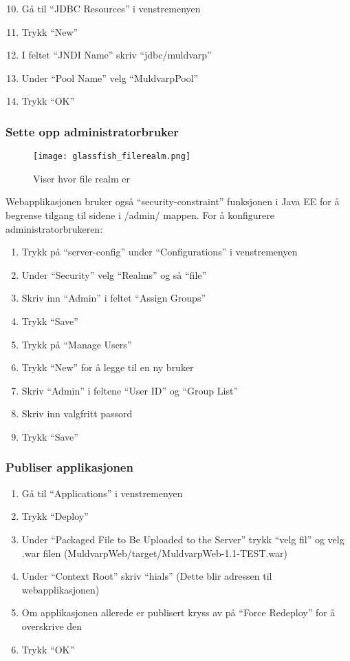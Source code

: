 \documentclass[../main.tex]{subfiles}
\begin{document}
\begin{enumerate}
\setcounter{enumi}{9}
\item Gå til “JDBC Resources” i venstremenyen
\item Trykk “New”
\item I feltet “JNDI Name” skriv “jdbc/muldvarp”
\item Under “Pool Name” velg “MuldvarpPool”
\item Trykk “OK”
\end{enumerate}

\subsubsection{Sette opp administratorbruker}

\begin{wrapfigure}{l}{3.5cm}
  \begin{center}
    \texttt{[image: glassfish\_filerealm.png]}
  \end{center}
  \caption{Viser hvor file realm er}
\end{wrapfigure}

Webapplikasjonen bruker også “security-constraint” funksjonen i Java EE for å begrense tilgang til sidene i /admin/ mappen. \newline
\newline
For å konfigurere administratorbrukeren:
\begin{enumerate}
\item Trykk på “server-config” under “Configurations” i venstremenyen
\item Under “Security” velg “Realms” og så “file”
\item Skriv inn “Admin” i feltet “Assign Groups”
\item Trykk “Save”
\item Trykk på “Manage Users”
\item Trykk “New” for å legge til en ny bruker
\item Skriv “Admin” i feltene “User ID” og “Group List”
\item Skriv inn valgfritt passord
\item Trykk “Save”
\end{enumerate}

\subsubsection{Publiser applikasjonen}
\begin{enumerate}
\item Gå til “Applications” i venstremenyen
\item Trykk “Deploy”
\item Under “Packaged File to Be Uploaded to the Server” trykk “velg fil” og velg .war filen (MuldvarpWeb/target/MuldvarpWeb-1.1-TEST.war)
\item Under “Context Root” skriv “hials” (Dette blir adressen til webapplikasjonen)
\item Om applikasjonen allerede er publisert kryss av på “Force Redeploy” for å overskrive den
\item Trykk “OK”
\end{enumerate}
\end{document}
